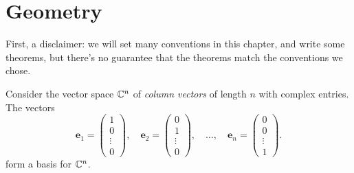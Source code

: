 \chapter{Geometry}

First, a disclaimer:
we will set many conventions in this chapter,
and write some theorems,
but there's no guarantee that the theorems match the conventions we chose.

Consider the vector space \(\mathbb{C}^n\) of \emph{column vectors} of length \(n\) with complex entries.
The vectors
\begin{equation}
    \mathbf{e}_1 = \begin{pmatrix} 1 \\ 0 \\ \vdots \\ 0 \end{pmatrix}, \quad
    \mathbf{e}_2 = \begin{pmatrix} 0 \\ 1 \\ \vdots \\ 0 \end{pmatrix}, \quad
    \ldots, \quad
    \mathbf{e}_n = \begin{pmatrix} 0 \\ 0 \\ \vdots \\ 1 \end{pmatrix}.
\end{equation}
form a basis for \(\mathbb{C}^n\).

